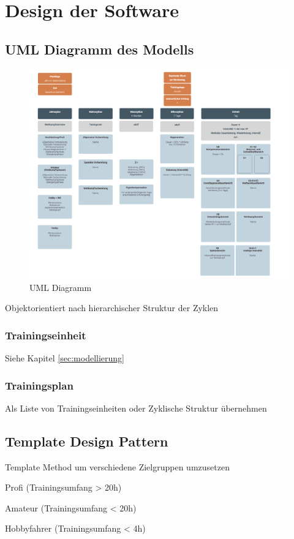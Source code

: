 \chapter{Design der Software}
\label{sec:design}

\section{UML Diagramm des Modells}
\label{sec:design:UML}
\begin{figure}[htb]
	\includegraphics[width=\textwidth]{gfx/uml.png}
	\caption{UML Diagramm}
	\label{fig:system:example1}
\end{figure}
Objektorientiert nach hierarchischer Struktur der Zyklen
\subsection{Trainingseinheit}
    Siehe Kapitel \ref{sec:modellierung}
\subsection{Trainingsplan}
    Als Liste von Trainingseinheiten oder Zyklische Struktur übernehmen
 
\section{Template Design Pattern}
\label{sec:design:template}
Template Method um verschiedene Zielgruppen umzusetzen

Profi (Trainingsumfang > 20h)

Amateur (Trainingsumfang < 20h)

Hobbyfahrer (Trainingsumfang < 4h)

